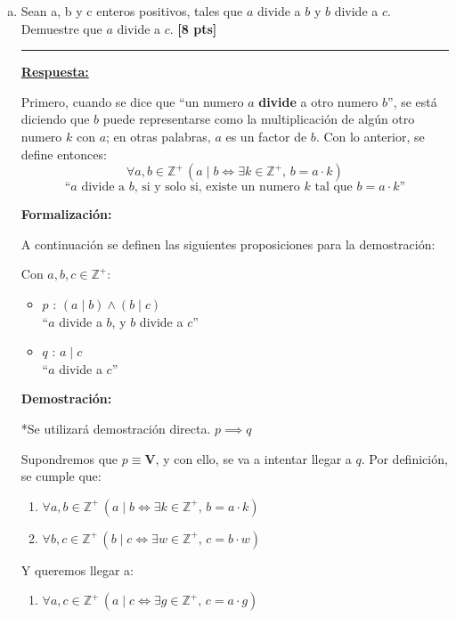 \documentclass[legalpaper,10pt]{article}
\begin{document}
\begin{enumerate}[a)]
\item Sean a, b y c enteros positivos, tales que $a$ divide a $b$ y $b$ divide a $c$. Demuestre que $a$ divide a $c$. \textbf{[8 pts]}

\rule{5cm}{0.4pt}

\underline{\textbf{Respuesta:}}

Primero, cuando se dice que ``un numero \(a\) \textbf{divide} a otro numero \(b\)'', se está diciendo que \(b\) puede representarse como la multiplicación de algún otro numero \(k\) con \(a\); en otras palabras, \(a\) es un factor de \(b\). Con lo anterior, se define entonces:
\[\boxed{\forall a, b \in \mathbb{Z}^+ \, (a \mid b \iff \exists k \in \mathbb{Z}^+ , \, b=a \cdot k)}\]
\[\text{``\(a\) divide a \(b\), si y solo si, existe un numero \(k\) tal que \(b = a \cdot k\)''}\]

\textbf{Formalización:}

A continuación se definen las siguientes proposiciones para la demostración:

Con \(a,b,c \in \mathbb{Z}^+\):
\begin{itemize}
    \item \(p\) : \((a \mid b) \land (b \mid c) \qquad\) \\ ``\(a\) divide a \(b\), y \(b\) divide a \(c\)''

    \item \(q\) : \(a \mid c \qquad\) \\ ``\(a\) divide a \(c\)''
\end{itemize}

\textbf{Demostración:}

*Se utilizará demostración directa. \(p \implies q\)

Supondremos que \(p \equiv \textbf{V}\), y con ello, se va a intentar llegar a \(q\). Por definición, se cumple que:
\begin{enumerate}[\quad 1)]
    \item \(\forall a,b \in \mathbb{Z}^+ \, (a \mid b \iff \exists k \in \mathbb{Z}^+ , \, b = a \cdot k)\)
    \item \(\forall b,c \in \mathbb{Z}^+ \, (b \mid c \iff \exists w \in \mathbb{Z}^+ , \, c = b \cdot w)\)
\end{enumerate}

Y queremos llegar a:
\begin{enumerate}[\quad 3)]
    \item \(\forall a,c \in \mathbb{Z}^+ \, (a \mid c \iff \exists g \in \mathbb{Z}^+ , \, c = a \cdot g)\)
\end{enumerate}


\end{enumerate}
\end{document}
